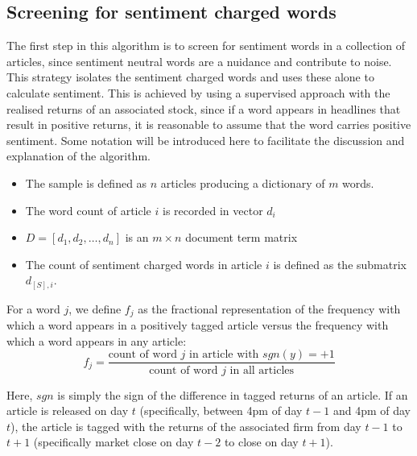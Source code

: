 \documentclass[ oneside,%
                    author={Joshua Felmeden},
                    degree={MEng},
                     title={Semantic Analysis of Financial Headlines Based on Realised Stock Returns},
                  subtitle={}]{dissertation}
\begin{document}
\subsection{Screening for sentiment charged words}
The first step in this algorithm is to screen for sentiment words in a collection of articles, since sentiment neutral words are a nuidance and contribute to noise. This strategy isolates the sentiment charged words and uses these alone to calculate sentiment. This is achieved by using a supervised approach with the realised returns of an associated stock, since if a word appears in headlines that result in positive returns, it is reasonable to assume that the word carries positive sentiment. Some notation will be introduced here to facilitate the discussion and explanation of the algorithm.
\begin{itemize}
      \item The sample is defined as $n$ articles producing a dictionary of $m$ words.
      \item The word count of article $i$ is recorded in vector $d_i$
      \item $D = [d_1, d_2, \dots, d_n]$ is an $m \times n$ document term matrix
      \item The count of sentiment charged words in article $i$ is defined as the submatrix $d_{[S],i}$.
\end{itemize}

For a word $j$, we define $f_j$ as the fractional representation of the frequency with which a word appears in a positively tagged article versus the frequency with which a word appears in any article:
\begin{equation}
f_j = \frac{\text{count of word } j \text{ in article with } sgn(y) = +1}{\text{count of word } j \text{ in all articles}}
\end{equation}

Here, $sgn$ is simply the sign of the difference in tagged returns of an article. If an article is released on day $t$ (specifically, between 4pm of day $t-1$ and 4pm of day $t$), the article is tagged with the returns of the associated firm from day $t-1$ to $t+1$ (specifically market close on day $t-2$ to close on day $t+1$). 
\end{document}
